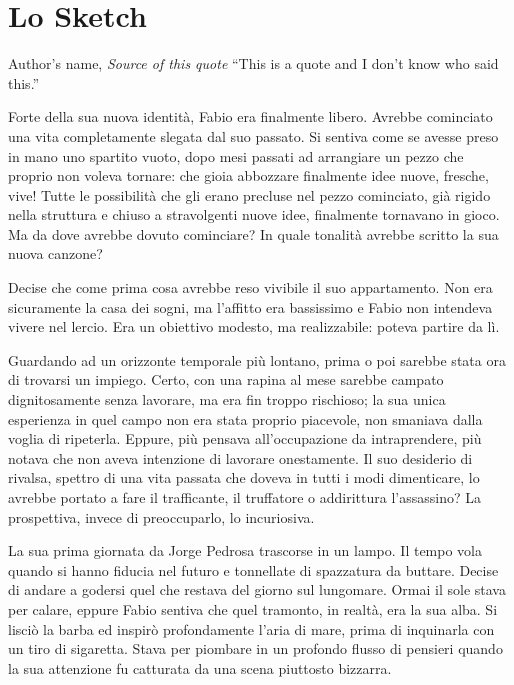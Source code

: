 \chapter{Lo Sketch}

\begin{chapquote}{Author's name, \textit{Source of this quote}}
``This is a quote and I don't know who said this.''
\end{chapquote}


Forte della sua nuova identità, Fabio era finalmente libero. Avrebbe cominciato una vita completamente slegata dal suo passato. Si sentiva come se avesse preso in mano uno spartito vuoto, dopo mesi passati ad arrangiare un pezzo che proprio non voleva tornare: che gioia abbozzare finalmente idee nuove, fresche, vive! Tutte le possibilità che gli erano precluse nel pezzo cominciato, già rigido nella struttura e chiuso a stravolgenti nuove idee, finalmente tornavano in gioco. Ma da dove avrebbe dovuto cominciare? In quale tonalità avrebbe scritto la sua nuova canzone?

Decise che come prima cosa avrebbe reso vivibile il suo appartamento. Non era sicuramente la casa dei sogni, ma l'affitto era bassissimo e Fabio non intendeva vivere nel lercio. Era un obiettivo modesto, ma realizzabile: poteva partire da lì.

Guardando ad un orizzonte temporale più lontano, prima o poi sarebbe stata ora di trovarsi un impiego. Certo, con una rapina al mese sarebbe campato dignitosamente senza lavorare, ma era fin troppo rischioso; la sua unica esperienza in quel campo non era stata proprio piacevole, non smaniava dalla voglia di ripeterla. Eppure, più pensava all'occupazione da intraprendere, più notava che non aveva intenzione di lavorare onestamente. Il suo desiderio di rivalsa, spettro di una vita passata che doveva in tutti i modi dimenticare, lo avrebbe portato a fare il trafficante, il truffatore o addirittura l'assassino? La prospettiva, invece di preoccuparlo, lo incuriosiva.

La sua prima giornata da Jorge Pedrosa trascorse in un lampo. Il tempo vola quando si hanno fiducia nel futuro e tonnellate di spazzatura da buttare. Decise di andare a godersi quel che restava del giorno sul lungomare. Ormai il sole stava per calare, eppure Fabio sentiva che quel tramonto, in realtà, era la sua alba. Si lisciò la barba ed inspirò profondamente l'aria di mare, prima di inquinarla con un tiro di sigaretta. Stava per piombare in un profondo flusso di pensieri quando la sua attenzione fu catturata da una scena piuttosto bizzarra.

